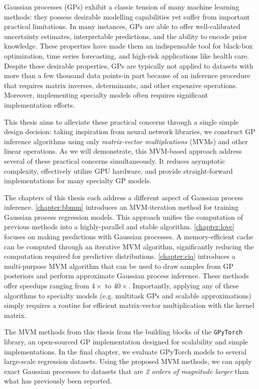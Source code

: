 Gaussian processes (GPs) exhibit a classic tension of many machine learning methods:
they possess desirable modelling capabilities yet suffer from important practical limitations.
In many instances, GPs are able to offer well-calibrated uncertainty estimates, interpretable predictions, and the ability to encode prior knowledge.
These properties have made them an indispensable tool for black-box optimization, time series forecasting, and high-risk applications like health care.
Despite these desirable properties, GPs are typically not applied to datasets with more than a few thousand data points-in part because of an inference procedure that requires matrix inverses, determinants, and other expensive operations.
Moreover, implementing specialty models often requires significant implementation efforts.

This thesis aims to alleviate these practical concerns through a single simple design decision:
taking inspiration from neural network libraries, we construct GP inference algorithms using only \emph{matrix-vector multiplcations} (MVMs) and other linear operations.
As we will demonstrate, this MVM-based approach address several of these practical concerns simultaneously.
It reduces asymptotic complexity, effectively utilize GPU hardware, and provide straight-forward implementations for many specialty GP models.

The chapters of this thesis each address a different aspect of Gaussian process inference.
\cref{chapter:bbmm} introduces an MVM-iteration method for training Gaussian process regression models.
This approach unifies the computation of previous methods into a highly-parallel and stable algorithm.
\cref{chapter:love} focuses on making predictions with Gaussian processes.
A memory-efficient cache can be computed through an iterative MVM algorithm, significantly reducing the computation required for predictive distributions.
\cref{chapter:ciq} introduces a multi-purpose MVM algorithm that can be used to draw samples from GP posteriors and perform approximate Gaussian process inference.
These methods offer speedups ranging from $4\times$ to $40\times$.
Importantly, applying any of these algorithms to specialty models (e.g. multitask GPs and scalable approximations) simply requires a routine for efficient matrix-vector multiplication with the kernel matrix.

The MVM methods from this thesis from the building blocks of the {\tt GPyTorch} library, an open-sourced GP implementation designed for scalability and simple implementations.
In the final chapter, we evaluate GPyTorch models to several large-scale regression datasets.
Using the proposed MVM methods, we can apply exact Gaussian processes to datasets that are \emph{2 orders of magnitude larger} than what has previously been reported.

